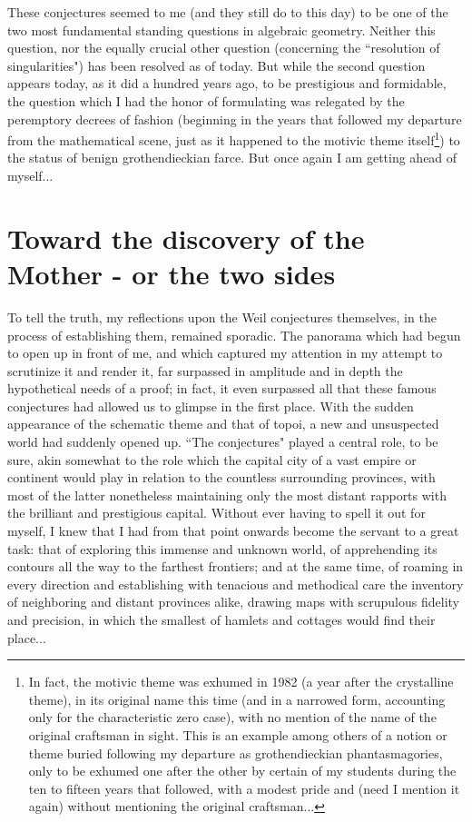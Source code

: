 These conjectures seemed to me (and they still do to this day) to be one of the two most fundamental standing questions in algebraic geometry. Neither this question, nor the equally crucial other question (concerning the ``resolution of singularities") has been resolved as of today. But while the second question appears today, as it did a hundred years ago, to be prestigious and formidable, the question which I had the honor of formulating was relegated by the peremptory decrees of fashion (beginning in the years that followed my departure from the mathematical scene, just as it happened to the motivic theme itself\footnote{In fact, the motivic theme was exhumed in 1982 (a year after the crystalline theme), in its original name this time (and in a narrowed form, accounting only for the characteristic zero case), with no mention of the name of the original craftsman in sight. This is an example among others of a notion or theme buried following my departure as grothendieckian phantasmagories, only to be exhumed one after the other by certain of my students during the ten to fifteen years that followed, with a modest pride and (need I mention it again) without mentioning the original craftsman...}) to the status of benign grothendieckian farce. But once again I am getting ahead of myself...

\section{Toward the discovery of the Mother - or the two sides}

To tell the truth, my reflections upon the Weil conjectures themselves, in the process of establishing them, remained sporadic. The panorama which had begun to open up in front of me, and which captured my attention in my attempt to scrutinize it and render it, far surpassed in amplitude and in depth the hypothetical needs of a proof; in fact, it even surpassed all that these famous conjectures had allowed us to glimpse in the first place. With the sudden appearance of the schematic theme and that of topoi, a new and unsuspected world had suddenly opened up. ``The conjectures" played a central role, to be sure, akin somewhat to the role which the capital city of a vast empire or continent would play in relation to the countless surrounding provinces, with most of the latter nonetheless maintaining only the most distant rapports with the brilliant and prestigious capital. Without ever having to spell it out for myself, I knew that I had from that point onwards become the servant to a great task: that of exploring this immense and unknown world, of apprehending its contours all the way to the farthest frontiers; and at the same time, of roaming in every direction and establishing with tenacious and methodical care the inventory of neighboring and distant provinces alike, drawing maps with scrupulous fidelity and precision, in which the smallest of hamlets and cottages would find their place...


